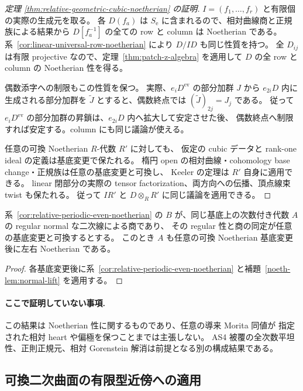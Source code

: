 \begin{proof}[定理 \ref{thm:relative-geometric-cubic-noetherian} の証明]
$I=(f_1,\ldots,f_r)$ と有限個の実際の生成元を取る。
各 $D(f_a)$ は $S_{\mathrm e}$ に含まれるので、相対曲線商と正規族による結果から
$D[f_a^{-1}]$ の全ての row と column は Noetherian である。
系~\ref{cor:linear-universal-row-noetherian} により $D/ID$ も同じ性質を持つ。
全 $D_{ij}$ は有限 projective なので、定理~\ref{thm:patch-z-algebra} を適用して
$D$ の全 row と column の Noetherian 性を得る。

偶数添字への制限もこの性質を保つ。
実際、$e_iD^{\mathrm{ev}}$ の部分加群 $J$ から $e_{2i}D$ 内に生成される部分加群を
$\widetilde J$ とすると、偶数終点では $(\widetilde J)_{2j}=J_j$ である。
従って $e_iD^{\mathrm{ev}}$ の部分加群の昇鎖は、$e_{2i}D$ 内へ拡大して安定させた後、
偶数終点へ制限すれば安定する。column にも同じ議論が使える。

任意の可換 Noetherian $R$-代数 $R'$ に対しても、
仮定の cubic データと rank-one ideal の定義は基底変更で保たれる。
楕円 open の相対曲線・cohomology base change・正規族は任意の基底変更と可換し、
Keeler の定理は $R'$ 自身に適用できる。
linear 閉部分の実際の tensor factorization、両方向への伝播、頂点線束 twist も保たれる。
従って $IR'$ と $D\otimes_RR'$ に同じ議論を適用できる。
\end{proof}

\begin{corollary}[AS4 被覆への帰結]
系~\ref{cor:relative-periodic-even-noetherian} の $B$ が、同じ基底上の次数付き代数 $A$ の regular normal な二次線による商であり、
その regular 性と商の同定が任意の基底変更と可換するとする。
このとき $A$ も任意の可換 Noetherian 基底変更後に左右 Noetherian である。
\end{corollary}

\begin{proof}
各基底変更後に系~\ref{cor:relative-periodic-even-noetherian} と補題~\ref{noeth-lem:normal-lift} を適用する。
\end{proof}

\paragraph{ここで証明していない事項.}
この結果は Noetherian 性に関するものであり、任意の導来 Morita 同値が
指定された相対 heart や偏極を保つことまでは主張しない。
AS4 被覆の全次数平坦性、正則正規元、相対 Gorenstein 解消は前提となる別の構成結果である。


\subsection{可換二次曲面の有限型近傍への適用}

